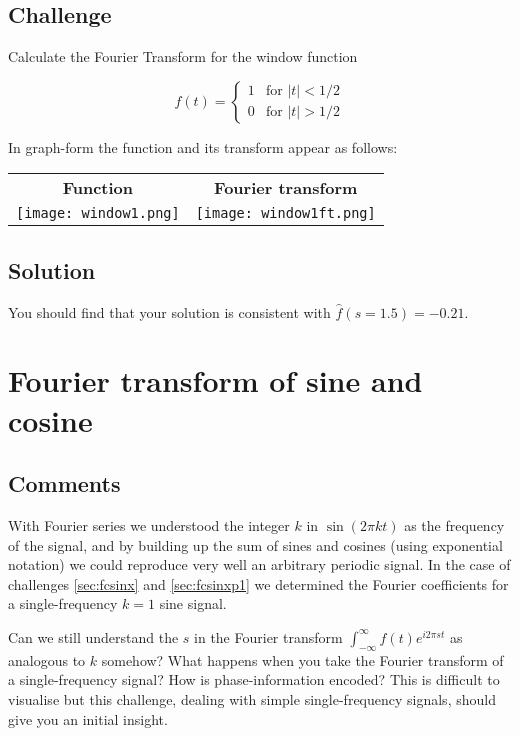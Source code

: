 \subsection*{Challenge}
Calculate the Fourier Transform for the window function

\begin{equation}
    f(t)=
    \begin{cases}
        1 & \text{for } |t| < 1/2 \\
        0 & \text{for } |t| > 1/2
    \end{cases}
\end{equation}

In graph-form the function and its transform appear as follows:

\begin{tabular}{cc}
    \textbf{Function} & \textbf{Fourier transform} \\
    \texttt{[image: window1.png]} & \texttt{[image: window1ft.png]}
\end{tabular}

\subsection*{Solution}
You should find that your solution is consistent with $\hat{f}(s=1.5)=-0.21$.




\newpage
\section{Fourier transform of sine and cosine}

\subsection*{Comments}
With Fourier series we understood the integer $k$ in $\sin(2 \pi k t)$ as the frequency of the signal, and by building up the sum of sines and cosines (using exponential notation) we could reproduce very well an arbitrary periodic signal. In the case of challenges \ref{sec:fcsinx} and \ref{sec:fcsinxp1} we determined the Fourier coefficients for a single-frequency $k=1$ sine signal.

Can we still understand the $s$ in the Fourier transform $\int_{-\infty}^{\infty} f(t) e^{i 2 \pi s t}$ as analogous to $k$ somehow? What happens when you take the Fourier transform of a single-frequency signal? How is phase-information encoded? This is difficult to visualise but this challenge, dealing with simple single-frequency signals, should give you an initial insight.

